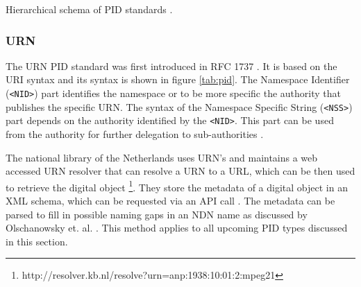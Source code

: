 \begin {table}[H]
\caption {Hierarchical schema of PID standards \cite{icn-bd}.} \label{tab:pid} 
\begin{center}
\end{center}
\end {table}


\subsubsection{URN}
The URN PID standard was first introduced in RFC 1737 \cite{rfc1737}. It is based on the URI syntax and its syntax is shown in figure \ref{tab:pid}. The Namespace Identifier (\texttt{\textless NID\textgreater}) part identifies the namespace or to be more specific the authority that publishes the specific URN.
The syntax of the Namespace Specific String (\texttt{\textless NSS\textgreater}) part depends on the authority identified by the \texttt{\textless NID\textgreater}. This part can be used from the authority for further delegation to sub-authorities \cite{icn-bd}.

The national library of the Netherlands uses URN's and maintains a web accessed URN resolver that can resolve a URN to a URL, which can be then used to retrieve the digital object \footnote{http://resolver.kb.nl/resolve?urn=anp:1938:10:01:2:mpeg21}.
They store the metadata of a digital object in an XML schema, which can be requested via an API call \cite{kb-urn}. The metadata can be parsed to fill in possible naming gaps in an NDN name as discussed by Olschanowsky et. al. \cite{ndn-clim}. This method applies to all upcoming PID types discussed in this section.

